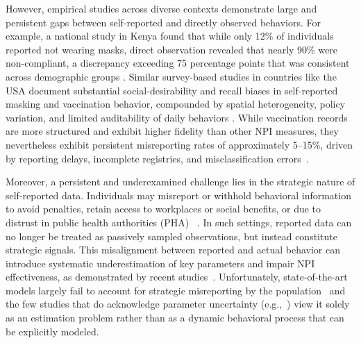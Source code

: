 \documentclass[sigconf,review]{acmart}
\begin{document}
However, empirical studies across diverse contexts demonstrate large and persistent gaps between self-reported and directly observed behaviors. For example, a national study in Kenya found that while only 12\% of individuals reported not wearing masks, direct observation revealed that nearly 90\% were non-compliant, a discrepancy exceeding 75 percentage points that was consistent across demographic groups \cite{kenya2021}. Similar survey-based studies in countries like the USA document substantial social-desirability and recall biases in self-reported masking and vaccination behavior, compounded by spatial heterogeneity, policy variation, and limited auditability of daily behaviors \cite{spatiotemporal}. While vaccination records are more structured and exhibit higher fidelity than other NPI measures, they nevertheless exhibit persistent misreporting rates of approximately 5–15\%, driven by reporting delays, incomplete registries, and misclassification errors~\cite{HURLEY2026128101,DALEY20242740,IRVING20096546}.

Moreover, a persistent and underexamined challenge lies in the strategic nature of self-reported data. Individuals may misreport or withhold behavioral information to avoid penalties, retain access to workplaces or social benefits, or due to distrust in public health authorities (PHA) ~\cite{levy2022,shiman2023}.  
In such settings, reported data 
can no longer be treated as passively sampled observations, but instead constitute strategic signals.
This misalignment between reported and actual behavior can introduce systematic underestimation of key parameters and impair NPI effectiveness, as demonstrated by recent studies~\cite{WuNature2020,PullanoNature2021,MilanesiArxiv2023}. Unfortunately, state-of-the-art models largely fail to account for strategic misreporting by the population~\cite{PatelJTB2005} %
and the few studies that do acknowledge parameter uncertainty
(e.g.,~\cite{TannerMB2018}) 
view it solely as an estimation problem rather than as a dynamic behavioral process that can be explicitly modeled.

\end{document}
